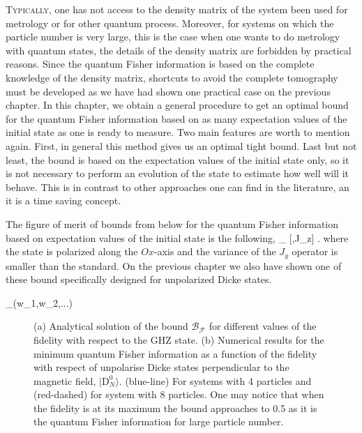 \lettrine[lines=2, findent=3pt,nindent=0pt]{T}{ypically}, one has not access to the density matrix of the system been used for metrology or for other quantum process.
Moreover, for systems on which the particle number is very large, this is the case when one wants to do metrology with quantum states, the details of the density matrix are forbidden by practical reasons.
Since the quantum Fisher information is based on the complete knowledge of the density matrix, shortcuts to avoid the complete tomography must be developed as we have had shown one practical case on the previous chapter.
In this chapter, we obtain a general procedure to get an optimal bound for the quantum Fisher information based on as many expectation values of the initial state as one is ready to measure.
Two main features are worth to mention again.
First, in general this method gives us an optimal tight bound.
Last but not least, the bound is based on the expectation values of the initial state only, so it is not necessary to perform an evolution of the state to estimate how well will it behave.
This is in contrast to other approaches one can find in the literature, an it is a time saving concept.

The figure of merit of bounds from below for the quantum Fisher information based on expectation values of the initial state is the following,
\be
  _{} [\rho,J_z] \geq {}.
\ee
where the state is polarized along the $Ox$-axis and the variance of the $J_y$ operator is smaller than the standard.
On the previous chapter we also have shown one of these bound specifically designed for unpolarized Dicke states.


\be
  _{}(w_1,w_2,...)
\ee

\begin{figure}
  \centering
  \caption{(a) Analytical solution of the bound $\mathcal{B}_{\mathcal{F}}$ for different values of the fidelity with respect to the GHZ state. (b) Numerical results for the minimum quantum Fisher information as a function of the fidelity with respect of unpolarise Dicke states perpendicular to the magnetic field, $|\text{D}_N^0\rangle$. (blue-line) For systems with 4 particles and (red-dashed) for system with 8 particles. One may notice that when the fidelity is at its maximum the bound approaches to 0.5 as it is the quantum Fisher information for large particle number.}
  \label{fig:vd-secuence-evo}
\end{figure}

